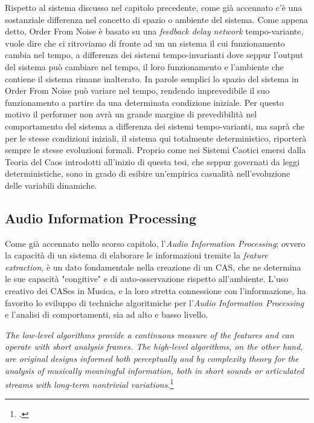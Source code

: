 Rispetto al sistema discusso nel capitolo precedente, 
come già accennato c'è una sostanziale differenza nel concetto di spazio
o ambiente del sistema. 
Come appena detto, Order From Noise è basato su una \textit{feedback delay network} 
tempo-variante, vuole dire che ci ritroviamo di fronte ad un un sistema il cui
funzionamento cambia nel tempo, a differenza dei sistemi tempo-invarianti
dove seppur l'output del sistema può cambiare nel tempo, 
il loro funzionamento e l'ambiente che contiene il sistema rimane inalterato.
In parole semplici lo spazio del sistema in Order From Noise può variare nel tempo,
rendendo imprevedibile il suo funzionamento a partire da una determinata condizione 
iniziale.
Per questo motivo il performer non avrà un grande margine di prevedibilità 
nel comportamento del sistema a differenza dei sistemi tempo-varianti,
ma saprà che per le stesse condizioni iniziali, il sistema qui totalmente
deterministico, riporterà sempre le stesse evoluzioni formali.
Proprio come nei Sistemi Caotici emersi dalla Teoria del Caos introdotti all'inizio di questa tesi,
che seppur governati da leggi deterministiche, 
sono in grado di esibire un'empirica casualità nell'evoluzione delle variabili dinamiche. \\

\subsection{Audio Information Processing}
\label{sec:Audio Information Processing}
Come già accennato nello scorso capitolo, l'\textit{Audio Information Processing};
ovvero la capacità di un sistema di elaborare le informazioni
tremite la \textit{feature extraction}, è un dato fondamentale nella creazione 
di un CAS, che ne determina le sue capacità "congitive" e di auto-osservazione
rispetto all'ambiente. 
L'uso creativo dei CASes in Musica,
e la loro stretta connessione con l'informazione,
ha favorito lo sviluppo di techniche algoritmiche per l'\textit{Audio Information Processing} 
e l'analisi di comportamenti, sia ad alto e basso livello.

\begin{center}
    \vspace{0.5cm}
    \textit{The low-level algorithms provide a continuous measure of the features and can operate
with short analysis frames. The high-level algorithms, on the other hand, are original designs informed both perceptually
and by complexity theory for the analysis of musically meaningful information, both in short sounds or articulated
streams with long-term nontrivial variations.}\footcite{sanfilippo_time-domain_2021}
\vspace{0.5cm}
\end{center}

